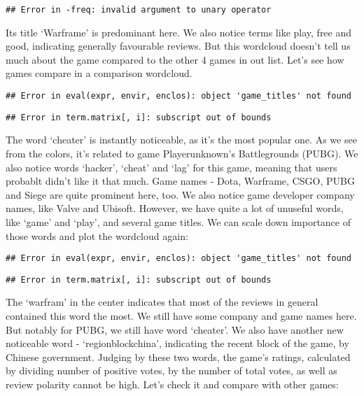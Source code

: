 \documentclass[]{article}
\begin{document}
\begin{verbatim}
## Error in -freq: invalid argument to unary operator
\end{verbatim}

Its title `Warframe' is predominant here. We also notice terms like
play, free and good, indicating generally favourable reviews. But this
wordcloud doesn't tell us much about the game compared to the other 4
games in out list. Let's see how games compare in a comparison
wordcloud.

\begin{verbatim}
## Error in eval(expr, envir, enclos): object 'game_titles' not found
\end{verbatim}

\begin{verbatim}
## Error in term.matrix[, i]: subscript out of bounds
\end{verbatim}

The word `cheater' is instantly noticeable, as it's the most popular
one. As we see from the colors, it's related to game Playerunknown's
Battlegrounds (PUBG). We also notice words `hacker', `cheat' and `lag'
for this game, meaning that users probablt didn't like it that much.
Game names - Dota, Warframe, CSGO, PUBG and Siege are quite prominent
here, too. We also notice game developer company names, like Valve and
Ubisoft. However, we have quite a lot of unuseful words, like `game' and
`play', and several game titles. We can scale down importance of those
words and plot the wordcloud again:

\begin{verbatim}
## Error in eval(expr, envir, enclos): object 'game_titles' not found
\end{verbatim}

\begin{verbatim}
## Error in term.matrix[, i]: subscript out of bounds
\end{verbatim}

The `warfram' in the center indicates that most of the reviews in
general contained this word the most. We still have some company and
game names here. But notably for PUBG, we still have word `cheater'. We
also have another new noticeable word - `regionblockchina', indicating
the recent block of the game, by Chinese government. Judging by these
two words, the game's ratings, calculated by dividing number of positive
votes, by the number of total votes, as well as review polarity cannot
be high. Let's check it and compare with other games:
\end{document}
